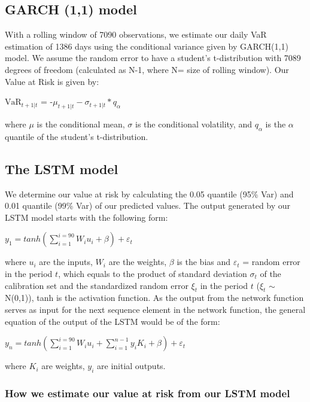 \documentclass[a4paper,11pt,oneside]{book}
\begin{document}
\subsection{GARCH (1,1) model}

With a rolling window of 7090 observations, we estimate our daily VaR estimation of 1386 days using the conditional variance given by GARCH(1,1) model. We assume the random error to have a student’s t-distribution with 7089 degrees of freedom (calculated as N-1, where N= size of rolling window). Our Value at Risk is given by:
\begin{center}
$\text{VaR}_{t+1|t}$ = -$\mu_{t+1|t} - \sigma_{t+1|t} * q_{\alpha}$
\end{center}
where $\mu$ is the conditional mean, $\sigma$ is the conditional volatility, and $q_{\alpha}$ is the $\alpha$ quantile of the student's t-distribution.

\subsection{The LSTM model}
We determine our value at risk by calculating the 0.05 quantile (95\% Var) and 0.01 quantile (99\% Var) of our predicted values. The output generated by our LSTM model starts with the following form:
\begin{center}
	$y_1= tanh(\sum_{i=1}^{i=90}W_{i}u_{i}+\beta)+\varepsilon_t$
\end{center} 

where $u_{i}$ are the inputs, $W_i$ are the weights, $\beta$ is the bias and $\varepsilon_t$ = random error in the period $t$, which equals to the
product of standard deviation $\sigma_t$ of the calibration set and  the
standardized random error $\xi_t$ in the period $t$ ($\xi_t$ $\sim$ N(0,1)), tanh is the activation function. As the output from the network function serves as input for the next sequence element in the network function, the general equation of the output of the LSTM would be of the form:

\begin{center}
	$y_n= tanh(\sum_{i=1}^{i=90}W_{i}u_{i}+\sum_{i=1}^{n-1}y_{i}K_{i}+\beta)+\varepsilon_t$
\end{center} 
where $K_i$ are weights, $y_i$ are initial outputs.

\subsubsection{How we estimate our value at risk from our LSTM model}
\end{document}
